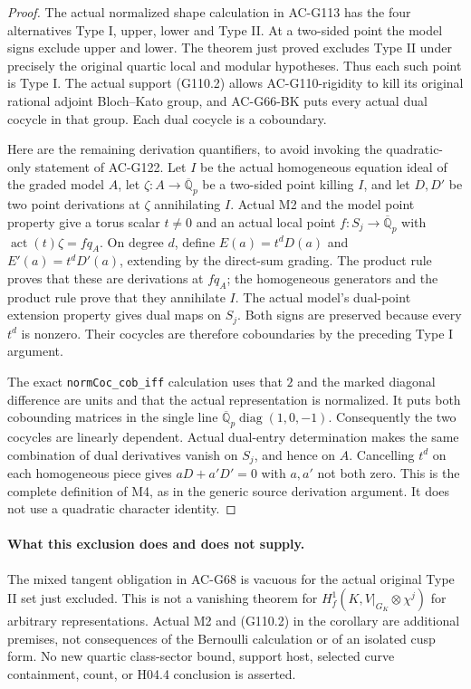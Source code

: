 \begin{proof}
The actual normalized shape calculation in AC-G113 has the
four alternatives Type I, upper, lower and Type II.  At a
two-sided point the model signs exclude upper and lower.
The theorem just proved excludes Type II under precisely
the original quartic local and modular hypotheses.
Thus each such point is Type I.  The actual support (G110.2)
allows AC-G110-rigidity to kill its original rational adjoint
Bloch--Kato group, and AC-G66-BK puts every actual dual
cocycle in that group.  Each dual cocycle is a coboundary.

Here are the remaining derivation quantifiers, to avoid
invoking the quadratic-only statement of AC-G122.
Let \(I\) be the actual homogeneous equation ideal of the
graded model \(A\), let \(\zeta:A\to\overline{\mathbb Q}_p\)
be a two-sided point killing \(I\), and let \(D,D'\) be two
point derivations at \(\zeta\) annihilating \(I\).
Actual M2 and the model point property give a torus scalar
\(t\ne0\) and an actual local point \(f:S_j\to
\overline{\mathbb Q}_p\) with
\(\operatorname{act}(t)\zeta=fq_A\).
On degree \(d\), define \(E(a)=t^dD(a)\) and
\(E'(a)=t^dD'(a)\), extending by the direct-sum grading.
The product rule proves that these are derivations at
\(fq_A\); the homogeneous generators and the product rule
prove that they annihilate \(I\).  The actual model's
dual-point extension property gives dual maps on \(S_j\).
Both signs are preserved because every \(t^d\) is nonzero.
Their cocycles are therefore coboundaries by the preceding
Type I argument.

The exact \texttt{normCoc\_cob\_iff} calculation uses that
\(2\) and the marked diagonal difference are units and that
the actual representation is normalized.  It puts both
cobounding matrices in the single line
\(\overline{\mathbb Q}_p\operatorname{diag}(1,0,-1)\).
Consequently the two cocycles are linearly dependent.
Actual dual-entry determination makes the same combination
of dual derivatives vanish on \(S_j\), and hence on \(A\).
Cancelling \(t^d\) on each homogeneous piece gives
\(aD+a'D'=0\) with \(a,a'\) not both zero.
This is the complete definition of M4, as in the generic
source derivation argument.  It does not use a quadratic
character identity.
\end{proof}

\paragraph{What this exclusion does and does not supply.}
The mixed tangent obligation in AC-G68 is vacuous for the
actual original Type II set just excluded.  This is not a
vanishing theorem for \(H_f^1(K,V|_{G_K}\otimes\chi^j)\)
for arbitrary representations.  Actual M2 and (G110.2)
in the corollary are additional premises, not consequences
of the Bernoulli calculation or of an isolated cusp form.
No new quartic class-sector bound, support host, selected
curve containment, count, or H04.4 conclusion is asserted.

